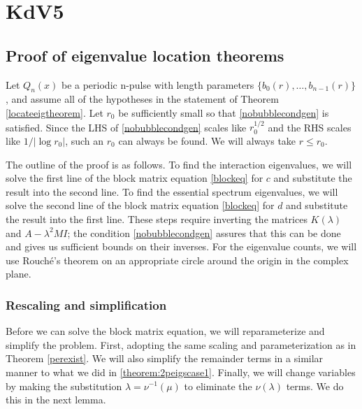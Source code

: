 \documentclass[thesis.tex]{subfiles}
\begin{document}
\iffulldocument\else
	\chapter{KdV5}
\fi

\section{Proof of eigenvalue location theorems}

Let $Q_n(x)$ be a periodic n-pulse with length parameters $\{ b_0(r), \dots, b_{n-1}(r)\}$, and assume all of the hypotheses in the statement of Theorem \ref{locateeigtheorem}. Let $r_0$ be sufficiently small so that \cref{nobubblecondgen} is satisfied. Since the LHS of \cref{nobubblecondgen} scales like $r_0^{1/2}$ and the RHS scales like $1/|\log r_0|$, such an $r_0$ can always be found. We will always take $r \leq r_0$.

The outline of the proof is as follows. To find the interaction eigenvalues, we will solve the first line of the block matrix equation \cref{blockeq} for $c$ and substitute the result into the second line. To find the essential spectrum eigenvalues, we will solve the second line of the block matrix equation \cref{blockeq} for $d$ and substitute the result into the first line. These steps require inverting the matrices $K(\lambda)$ and $A - \lambda^2 M I$; the condition \cref{nobubblecondgen} assures that this can be done and gives us sufficient bounds on their inverses. For the eigenvalue counts, we will use Rouch\'e's theorem on an appropriate circle around the origin in the complex plane.

\subsection{Rescaling and simplification}

Before we can solve the block matrix equation, we will reparameterize and simplify the problem. First, adopting the same scaling and parameterization as in Theorem \ref{perexist}. We will also simplify the remainder terms in a similar manner to what we did in \cref{theorem:2peigscase1}. Finally, we will change variables by making the substitution $\lambda = \nu^{-1}(\mu)$ to eliminate the $\nu(\lambda)$ terms. We do this in the next lemma.
\end{document}
